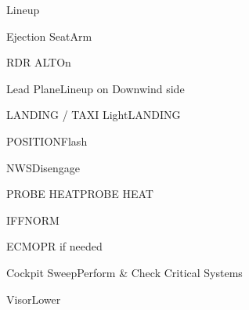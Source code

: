 \documentclass[sim-use]{checklist}
\begin{document}
\begin{checklist}{Lineup}
	\item{Ejection Seat}{Arm}
	\item{RDR ALT}{On}
	\item{Lead Plane}{Lineup on Downwind side}
	\item{LANDING / TAXI Light}{LANDING}
	\item{POSITION}{Flash}
	\item{NWS}{Disengage}
	\item{PROBE HEAT}{PROBE HEAT}
	\item{IFF}{NORM}
	\item{ECM}{OPR if needed}
	\item{Cockpit Sweep}{Perform \& Check Critical Systems}
	\item{Visor}{Lower}
\end{checklist}
\end{document}
